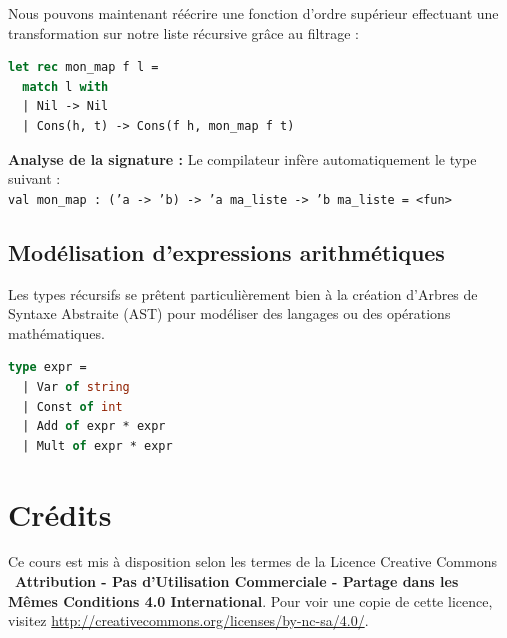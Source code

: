 \documentclass{article}
\begin{document}
Nous pouvons maintenant réécrire une fonction d'ordre supérieur effectuant une transformation sur notre liste récursive grâce au filtrage :

\begin{lstlisting}[language=Caml]
let rec mon_map f l =
  match l with
  | Nil -> Nil
  | Cons(h, t) -> Cons(f h, mon_map f t)
\end{lstlisting}

\noindent\textbf{Analyse de la signature :} Le compilateur infère automatiquement le type suivant : \\
\texttt{val mon\_map : ('a -> 'b) -> 'a ma\_liste -> 'b ma\_liste = \textless fun\textgreater}

\subsection{Modélisation d'expressions arithmétiques}

Les types récursifs se prêtent particulièrement bien à la création d'Arbres de Syntaxe Abstraite (AST) pour modéliser des langages ou des opérations mathématiques.

\begin{lstlisting}[language=Caml]
type expr =
  | Var of string
  | Const of int
  | Add of expr * expr
  | Mult of expr * expr
\end{lstlisting}


\noindent{}

\newpage
\tableofcontents

\section*{Crédits}
Ce cours est mis à disposition selon les termes de la Licence Creative Commons \ccbyncsa\ \textbf{Attribution - Pas d'Utilisation Commerciale - Partage dans les Mêmes Conditions 4.0 International}. 
Pour voir une copie de cette licence, visitez \url{http://creativecommons.org/licenses/by-nc-sa/4.0/}.
\end{document}
